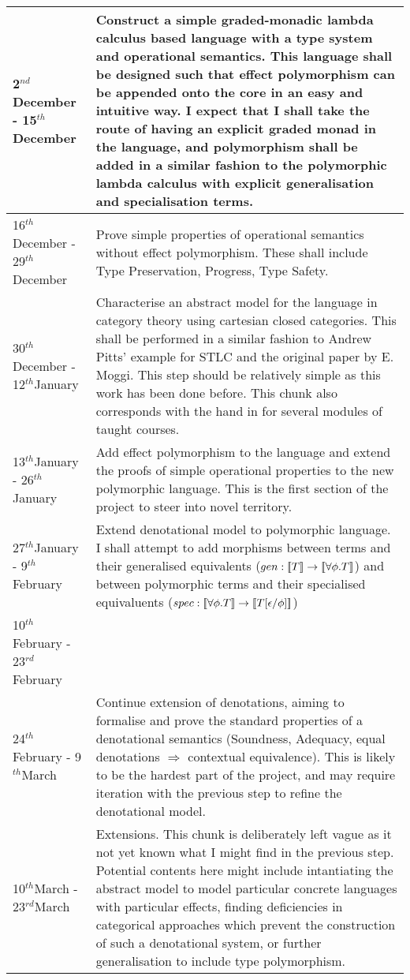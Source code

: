 \documentclass[11pt]{article}
\newcommand{\deno}[1]{{\bf [\![}#1{\bf ]\!]}}
\renewcommand{\th}{$^{th}$}
\newcommand{\nd}{$^{nd}$}
\newcommand{\rd}{$^{rd}$}
\begin{document}
\begin{tabular}{|p{6cm}||p{10cm}|}
\hline
	2\nd December - 15\th December & Construct a simple graded-monadic lambda calculus based language with a type system and operational semantics. This language shall be designed such that effect polymorphism can be appended onto the core in an easy and intuitive way. I expect that I shall take the route of having an explicit graded monad in the language, and polymorphism shall be added in a similar fashion to the polymorphic lambda calculus with explicit generalisation and specialisation terms.\\\hline
	16\th December - 29\th December & Prove simple properties of operational semantics without effect polymorphism. These shall include Type Preservation, Progress, Type Safety.\\\hline
	30\th December - 12\th January & Characterise an abstract model for the language in category theory using cartesian closed categories. This shall be performed in a similar fashion to Andrew Pitts' example for STLC and the original paper by E. Moggi. This step should be relatively simple as this work has been done before. This chunk also corresponds with the hand in for several modules of taught courses.  \\\hline
	13\th January - 26\th January &  Add effect polymorphism to the language and extend the proofs of simple operational properties to the new polymorphic language. This is the first section of the project to steer into novel territory. \\\hline
	27\th January - 9\th February &  Extend denotational model to polymorphic language. I shall attempt to add morphisms between terms and their generalised equivalents ($gen: \deno{T} \rightarrow \deno{\forall \phi. T} $) and between polymorphic terms and their specialised equivaluents 
	($spec: \deno{\forall \phi. T} \rightarrow \deno{T[ \epsilon / \phi ]} $)
	\\\cline{1-1}
	10\th February - 23\rd February &  \\\hline
	24\th February - 9\th March & Continue extension of denotations, aiming to formalise and prove the standard properties of a denotational semantics (Soundness, Adequacy, equal denotations $\Rightarrow$ contextual equivalence). This is likely to be the hardest part of the project, and may require iteration with the previous step to refine the denotational model. \\\hline
	10\th March - 23\rd March & Extensions. This chunk is deliberately left vague as it not yet known what I might find in the previous step. Potential contents here might include intantiating the abstract model to model particular concrete languages with particular effects, finding deficiencies in categorical approaches which prevent the construction of such a denotational system, or further generalisation to include type polymorphism. \\\hline

\end{tabular}
\end{document}
